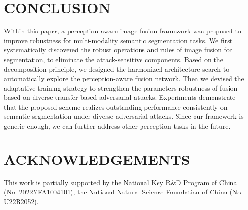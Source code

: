 \documentclass[sigconf]{acmart}
\begin{document}
\section{CONCLUSION}
Within this paper, a perception-aware image fusion framework was proposed to improve robustness for multi-modality semantic segmentation tasks. We first systematically discovered the robust operations and rules of image fusion for segmentation, to eliminate the attack-sensitive
components. Based on the decomposition principle, we designed the harmonized architecture search to automatically explore the perception-aware fusion network. Then we devised the adaptative training strategy to strengthen the parameters robustness of fusion based on diverse transfer-based adversarial attacks. Experiments demonstrate that the proposed scheme realizes outstanding performance consistently on semantic segmentation under diverse  adversarial attacks. Since our framework is generic enough, we can further address other  perception tasks in the future.
\section*{ACKNOWLEDGEMENTS}
This work is partially supported by the National Key R\&D Program of China (No. 2022YFA1004101), the National Natural Science Foundation of China (No. U22B2052).


\newpage
\balance


\end{document}
